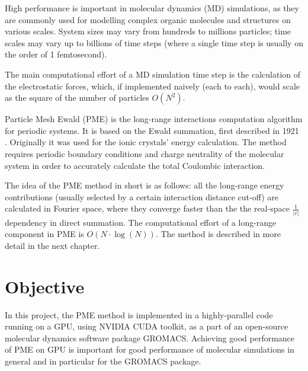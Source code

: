 \documentclass[12pt,a4paper]{report}
\begin{document}
High performance is important in molecular dynamics (MD) simulations, as they are commonly used for modelling complex organic molecules and structures on various scales. System sizes may vary from hundreds to millions particles; time scales may vary up to billions of time steps (where a single time step is usually on the order of 1 femtosecond).

The main computational effort of a MD simulation time step is the calculation of the electrostatic forces, which, if implemented naively (each to each), would scale as the square of the number of particles $O(N^2)$.

Particle Mesh Ewald (PME) is the long-range interactions computation algorithm for periodic systems. It is based on the Ewald summation, first described in 1921 \cite{pme}. Originally it was used for the ionic crystals' energy calculation. The method requires periodic boundary conditions and charge neutrality of the molecular system in order to accurately calculate the total Coulombic interaction. 

The idea of the PME method in short is as follows: all the long-range energy contributions (usually selected by a certain interaction distance cut-off) are calculated in Fourier space, where they converge faster than the the real-space $\frac{1}{\lvert r\rvert}$ dependency in direct summation. The computational effort of a long-range component in PME is $ O(N\cdot\log(N))$. The method is described in more detail in the next chapter.
 
\section{Objective} 
 
In this project, the PME method is implemented in a highly-parallel code running on a GPU, using NVIDIA CUDA toolkit, as a part of an open-source molecular dynamics software package GROMACS. 
Achieving good performance of PME on GPU is important for good performance of molecular simulations in general and in particular for the GROMACS package. 
\end{document}
